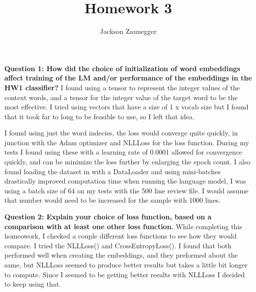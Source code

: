\documentclass[12pt]{article}
\title{Homework 3}
\author{Jackson Zaunegger}
\date{}
\begin{document}
\maketitle
\textbf{Question 1: How did the choice of initialization of word embeddings affect training of the LM and/or performance of the embeddings in the HW1 classifier?}
I found using a tensor to represent the integer values of the context words, and a tensor for the integer value of the target word to be the most effective. I tried using vectors that have a size of 1 x vocab size but I found that it took far to long to be feasible to use, so I left that idea.

I found using just the word indecies, the loss would converge quite quickly, in junction with the Adam optimizer and NLLLoss for the loss function. During my tests I found using these with a learning rate of 0.0001 allowed for convergence quickly, and can be minimize the loss further by enlarging the epoch count. I also found loading the dataset in with a DataLoader and using mini-batches drastically improved computation time when running the language model, I was using a batch size of 64 on my tests with the 500 line review file. I would assume that number would need to be increased for the sample with 1000 lines. 

\textbf{Question 2: Explain your choice of loss function, based on a comparison with at least one other loss function.}
While completing this homeowork, I checked a couple different loss functions to see how they would compare. I tried the NLLLoss() and CrossEntropyLoss(). I found that both performed well when creating the embeddings, and they preformed about the same, but NLLLoss seemed to produce better results but takes a little bit longer to compute. Since I seemed to be getting better results with NLLLoss I decided to keep using that. 
\end{document}

